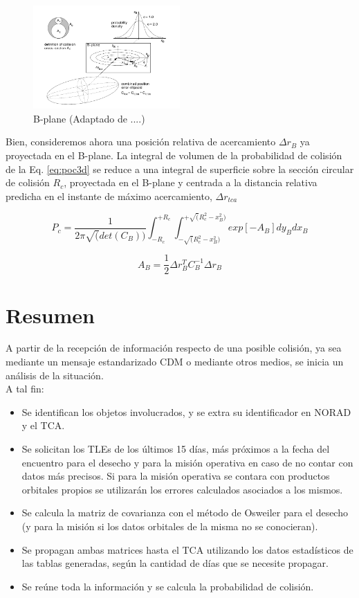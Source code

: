 \begin{figure}[!h]
\centering
 \includegraphics[width=0.5\textwidth]{imagenes/akellabplane}
 \caption{ B-plane (Adaptado de ....)}
 \label{fig:bplane}
\end{figure}

Bien, consideremos ahora una posici\'on relativa de acercamiento $\Delta r_{B}$ ya proyectada en el B-plane. La integral de volumen de la probabilidad de colisi\'on de la Eq. \ref{eq:poc3d} se reduce a una integral de superficie sobre la secci\'on circular de colisi\'on $R_{c}$, proyectada en el B-plane y centrada a la distancia relativa predicha en el instante de m\'aximo acercamiento, $\Delta r_{tca}$

\begin{equation}
P_{c} = \frac{1}{2 \pi \sqrt(det(C_{B}))} \int_{-R_{c}}^{+R_{c}} \int_{-\sqrt(R^{2}_{c}-x^{2}_{B})}^{+\sqrt(R^{2}_{c}-x^{2}_{B})} exp [- A_{B}] dy_{B} dx_{B}
\end{equation}

\begin{equation}
A_{B}=\frac{1}{2}\Delta r^{T}_{B} C^{-1}_{B} \Delta r_{B}
\end{equation}

\section*{Resumen}
A partir de la recepci\'on de informaci\'on respecto de una posible colisi\'on, ya sea mediante un mensaje estandarizado CDM o mediante otros medios, se inicia un an\'alisis de la situaci\'on.\\
A tal fin:\\
\begin{itemize}
 \item Se identifican los objetos involucrados, y se extra su identificador en NORAD y el TCA.
 \item Se solicitan los TLEs de los \'ultimos 15 d\'ias, m\'as pr\'oximos a la fecha del encuentro para el desecho y para la misi\'on operativa en caso de no contar con datos m\'as precisos. Si para la misi\'on operativa se contara con productos orbitales propios se utilizar\'an los errores calculados asociados a los mismos.
 \item Se calcula la matriz de covarianza con el m\'etodo de Osweiler para el desecho (y para la misi\'on si los datos orbitales de la misma no se conocieran).
 \item Se propagan ambas matrices hasta el TCA utilizando los datos estad\'isticos de las tablas generadas, seg\'un la cantidad de d\'ias que se necesite propagar.
 \item Se re\'une toda la informaci\'on y se calcula la probabilidad de colisi\'on.
\end{itemize}

